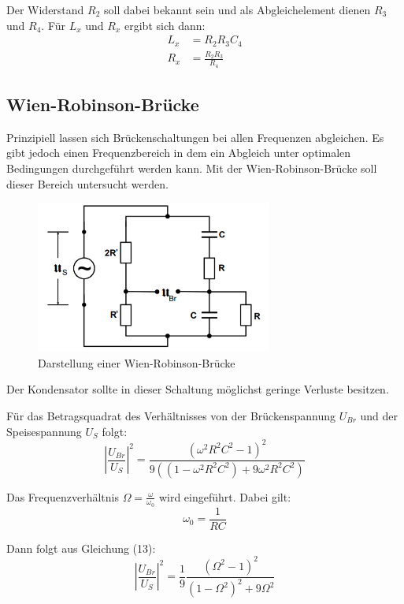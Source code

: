 Der Widerstand $R_2$ soll dabei bekannt sein und als Abgleichelement dienen $R_3$ und $R_4$.
Für $L_x$ und $R_x$ ergibt sich dann:
\begin{align}
  L_x &= R_2 R_3 C_4 \\
  R_x &= \frac{R_2 R_3}{R_4}
\end{align}


\subsection{Wien-Robinson-Brücke}
Prinzipiell lassen sich Brückenschaltungen bei allen Frequenzen abgleichen. Es gibt jedoch einen
Frequenzbereich in dem ein Abgleich unter optimalen Bedingungen durchgeführt werden kann. Mit der
Wien-Robinson-Brücke soll dieser Bereich untersucht werden.

\begin{figure}[H]
  \centering
  \includegraphics[height=5cm]{wien.PNG}
  \caption{Darstellung einer Wien-Robinson-Brücke}
  \label{fig:wien}
\end{figure}
Der Kondensator sollte in dieser Schaltung möglichst geringe Verluste besitzen.

Für das Betragsquadrat des Verhältnisses von der Brückenspannung $U_{Br}$ und der Speisespannung $U_S$ folgt:
\begin{equation}
  \left|\frac{U_{Br}}{U_S} \right|^2 = \frac{(\omega^2 R^2 C^2 -1)^2}{9((1- \omega^2 R^2 C^2) + 9 \omega^2 R^2 C^2)}
\end{equation}

Das Frequenzverhältnis $\Omega = \frac{\omega}{\omega_0}$ wird eingeführt. Dabei gilt:
\begin{equation}
  \omega_0 = \frac{1}{RC}
\end{equation}

Dann folgt aus Gleichung (13):
\begin{equation}
  \left|\frac{U_{Br}}{U_S} \right|^2 = \frac{1}{9} \frac{(\Omega^2 -1)^2}{(1- \Omega^2)^2 + 9 \Omega^2}
\end{equation}


